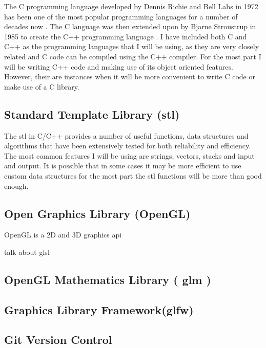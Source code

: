 The C programming language developed by Dennis Richie and Bell Labs in 1972 has been one of the most popular programming languages for a number of decades now \cite{ritchie1975c}. The C language was then extended upon by Bjarne Stroustrup in 1985 to create the C++ programming language \cite{stroustrup2000c++}. I have included both C and C++ as the programming languages that I will be using, as they are very closely related and C code can be compiled using the C++ compiler. For the most part I will be writing C++ code and making use of its object oriented features. However, their are instances when it will be more convenient to write C code or make use of a C library. 

\subsection{Standard Template Library (\acrshort{stl})}

The \acrshort{stl} in C/C++ provides a number of useful functions, data structures and algorithms that have been extensively tested for both reliability and efficiency. The most common features I will be using are strings, vectors, stacks and input and output. It is possible that in some cases it may be more efficient to use custom data structures for the most part the \acrshort{stl} functions will be more than good enough. \cite{horton2015stl} 

\subsection{Open Graphics Library (OpenGL)}

\gls{OpenGL} is a 2D and 3D graphics \acrshort{api}

talk about \acrshort{glsl}
\cite{movania2017opengl}

\subsection{OpenGL Mathematics Library ( \acrshort{glm} )}

\subsection{Graphics Library Framework(\acrshort{glfw})}

\subsection{Git Version Control}







